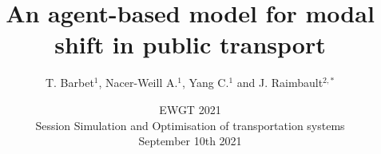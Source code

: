 




\title[An ABM for modal shift]{An agent-based model for modal shift in public transport}

\author[Barbet et al.]{T. Barbet$^{1}$, Nacer-Weill A.$^{1}$, Yang C.$^{1}$ and J. Raimbault$^{2,\ast}$
}




\date[10/09/2021]{EWGT 2021\\
Session Simulation and Optimisation of transportation systems\\
September 10th 2021
}

\frame{\maketitle}




